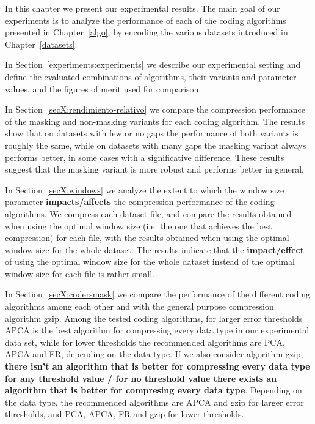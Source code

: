 
In this chapter we present our experimental results. The main goal of our experiments is to analyze the performance of each of the coding algorithms presented in Chapter~\ref{algo}, by encoding the various datasets introduced in Chapter~\ref{datasets}. 

In Section~\ref{experiments:experiments} we describe our experimental setting and define the evaluated combinations of algorithms, their variants and parameter values, and the figures of merit used for comparison. 

In Section~\ref{secX:rendimiento-relativo} we compare the compression performance of the masking and non-masking variants for each coding algorithm. The results show that on datasets with few or no gaps the performance of both variants is roughly the same, while on datasets with many gaps the masking variant always performs better, in some cases with a significative difference. These results suggest that the masking variant is more robust and performs better in general. 

In Section~\ref{secX:windows} we analyze the extent to which the window size parameter \textbf{impacts/affects} the compression performance of the coding algorithms. We compress each dataset file, and compare the results obtained when using the optimal window size (i.e. the one that achieves the best compression) for each file, with the results obtained when using the optimal window size for the whole dataset. The results indicate that the \textbf{impact/effect} of using the optimal window size for the whole dataset instead of the optimal window size for each file is rather small. 

In Section~\ref{secX:codersmask} we compare the performance of the different coding algorithms among each other and with the general purpose compression algorithm gzip. Among the tested coding algorithms, for larger error thresholds APCA is the best algorithm for compressing every data type in our experimental data set, while for lower thresholds the recommended algorithms are PCA, APCA and FR, depending on the data type. If we also consider algorithm gzip, \textbf{there isn't an algorithm that is better for compressing every data type for any threshold value / for no threshold value there exists an algorithm that is better for compresing every data type}. Depending on the data type, the recommended algorithms are APCA and gzip for larger error thresholds, and PCA, APCA, FR and gzip for lower thresholds.

